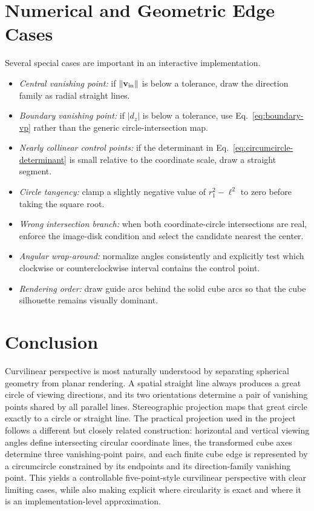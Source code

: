 \section{Numerical and Geometric Edge Cases}
Several special cases are important in an interactive implementation.
\begin{itemize}
  \item \emph{Central vanishing point:} if $\lVert\vb v_{\rm in}\rVert$ is below a tolerance, draw the direction family as radial straight lines.
  \item \emph{Boundary vanishing point:} if $|d_z|$ is below a tolerance, use Eq.~\eqref{eq:boundary-vp} rather than the generic circle-intersection map.
  \item \emph{Nearly collinear control points:} if the determinant in Eq.~\eqref{eq:circumcircle-determinant} is small relative to the coordinate scale, draw a straight segment.
  \item \emph{Circle tangency:} clamp a slightly negative value of $r_1^2-\ell^2$ to zero before taking the square root.
  \item \emph{Wrong intersection branch:} when both coordinate-circle intersections are real, enforce the image-disk condition and select the candidate nearest the center.
  \item \emph{Angular wrap-around:} normalize angles consistently and explicitly test which clockwise or counterclockwise interval contains the control point.
  \item \emph{Rendering order:} draw guide arcs behind the solid cube arcs so that the cube silhouette remains visually dominant.
\end{itemize}

\section{Conclusion}
Curvilinear perspective is most naturally understood by separating spherical geometry from planar rendering.  A spatial straight line always produces a great circle of viewing directions, and its two orientations determine a pair of vanishing points shared by all parallel lines.  Stereographic projection maps that great circle exactly to a circle or straight line.  The practical projection used in the project follows a different but closely related construction: horizontal and vertical viewing angles define intersecting circular coordinate lines, the transformed cube axes determine three vanishing-point pairs, and each finite cube edge is represented by a circumcircle constrained by its endpoints and its direction-family vanishing point.  This yields a controllable five-point-style curvilinear perspective with clear limiting cases, while also making explicit where circularity is exact and where it is an implementation-level approximation.
